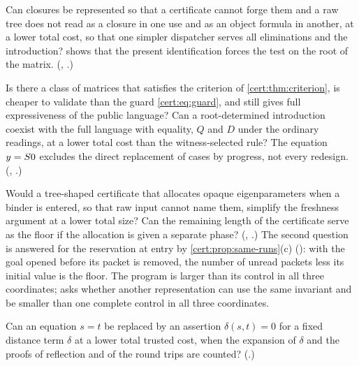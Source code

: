 \begin{question}
Can closures be represented so that a certificate cannot forge them and a
raw tree does not read as a closure in one use and as an object formula in
another, at a lower total cost, so that one simpler dispatcher serves all
eliminations and the introduction?  shows
that the present identification forces the test on the root of the matrix.
(, .)
\end{question}

\begin{question}
Is there a class of matrices that satisfies the criterion of
\cref{cert:thm:criterion}, is cheaper to validate than the guard
\eqref{cert:eq:guard}, and still gives full expressiveness of the public
language? Can a root-determined introduction coexist with the full language
with equality, $Q$ and $D$ under the ordinary readings, at a lower
total cost than the witness-selected rule? The equation $y=S 0$ excludes
the direct replacement of cases by progress, not every redesign.
(, .)
\end{question}

\begin{question}
Would a tree-shaped certificate that allocates opaque eigenparameters when a
binder is entered, so that raw input cannot name them, simplify the freshness
argument at a lower total size? Can the remaining length of the certificate
serve as the floor if the allocation is given a separate phase?
(, .) The second question is answered for the
reservation at entry by \cref{cert:prop:same-runs}(c) (): with the goal opened before
its packet is removed, the number of unread packets less its initial value is the floor. The program is
larger than its control in all three coordinates;  asks whether another
representation can use the same invariant and be smaller than one complete control in all three
coordinates.
\end{question}

\begin{question}
Can an equation $s=t$ be replaced by an assertion $\delta(s,t)=0$ for a fixed
distance term $\delta$ at a lower total trusted cost, when the expansion of
$\delta$ and the proofs of reflection and of the round trips are counted?
(.)
\end{question}

